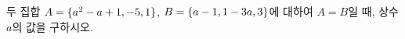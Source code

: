 두 집합 $A=\{a^2-a+1{,}\mkern3mu\mathopen{}-5{,}\mkern3mu\mathopen{}1\}$, $B=\{a-1{,}\mkern3mu\mathopen{}1-3a{,}\mkern3mu\mathopen{}3\}$에 대하여 $A=B$일 때, 상수 $a$의 값을 구하시오.
